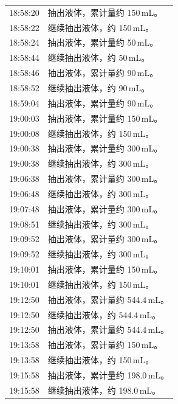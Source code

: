 \documentclass[UTF8,10pt,a4paper,fontset=fandol]{ctexart}
\begin{document}
\vspace{1em}

\begin{tabularx}{\textwidth}{@{}p{}X@{}}
18:58:20 & 抽出液体，累计量约 150\,mL。\\
18:58:22 & 继续抽出液体，约 150\,mL。\\
18:58:24 & 抽出液体，累计量约 50\,mL。\\
18:58:44 & 继续抽出液体，约 50\,mL。\\
18:58:46 & 抽出液体，累计量约 90\,mL。\\
18:58:52 & 继续抽出液体，约 90\,mL。\\
18:59:04 & 抽出液体，累计量约 90\,mL。\\
19:00:03 & 抽出液体，累计量约 150\,mL。\\
19:00:08 & 继续抽出液体，约 150\,mL。\\
19:00:38 & 抽出液体，累计量约 300\,mL。\\
19:00:38 & 继续抽出液体，约 300\,mL。\\
19:06:38 & 抽出液体，累计量约 300\,mL。\\
19:06:48 & 继续抽出液体，约 300\,mL。\\
19:07:48 & 抽出液体，累计量约 300\,mL。\\
19:08:51 & 继续抽出液体，约 300\,mL。\\
19:09:52 & 抽出液体，累计量约 300\,mL。\\
19:09:52 & 继续抽出液体，约 300\,mL。\\
19:10:01 & 抽出液体，累计量约 150\,mL。\\
19:10:01 & 继续抽出液体，约 150\,mL。\\
19:12:50 & 抽出液体，累计量约 544.4\,mL。\\
19:12:50 & 继续抽出液体，约 544.4\,mL。\\
19:12:50 & 抽出液体，累计量约 544.4\,mL。\\
19:13:58 & 抽出液体，累计量约 150\,mL。\\
19:13:58 & 继续抽出液体，约 150\,mL。\\
19:15:58 & 抽出液体，累计量约 198.0\,mL。\\
19:15:58 & 继续抽出液体，约 198.0\,mL。\\
\end{tabularx}

\end{document}
